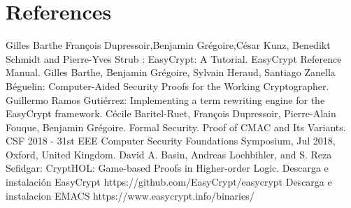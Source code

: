 \documentclass[runningheads,a4paper]{llncs}
\begin{document}
\section{References}

\begin{thebibliography}{1}
Gilles Barthe François Dupressoir,Benjamin Grégoire,César Kunz, Benedikt Schmidt and Pierre-Yves Strub : EasyCrypt: A Tutorial. 
EasyCrypt Reference Manual.
Gilles Barthe, Benjamin Grégoire, Sylvain Heraud, Santiago Zanella Béguelin: Computer-Aided Security Proofs
for the Working Cryptographer.
Guillermo Ramos Gutiérrez: Implementing a term rewriting
engine for the EasyCrypt framework.
Cécile Baritel-Ruet, François Dupressoir, Pierre-Alain Fouque, Benjamin Grégoire. Formal Security.
Proof of CMAC and Its Variants. CSF 2018 - 31st EEE Computer Security Foundations Symposium,
Jul 2018, Oxford, United Kingdom.
David A. Basin, Andreas Lochbihler, and S. Reza Sefidgar: CryptHOL: Game-based Proofs in
Higher-order Logic.
Descarga e instalación EasyCrypt https://github.com/EasyCrypt/easycrypt
Descarga e instalacion EMACS https://www.easycrypt.info/binaries/ 
\end{thebibliography}
\end{document}
